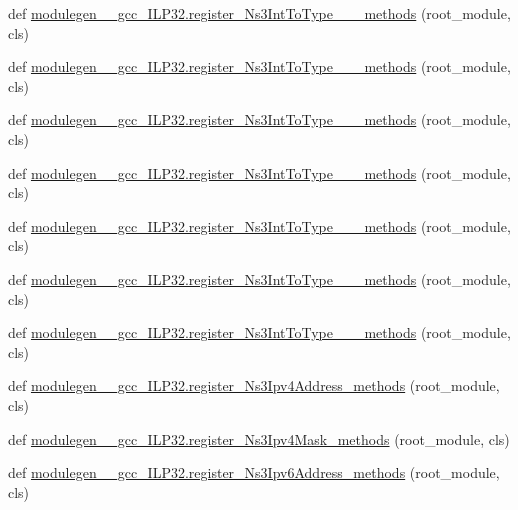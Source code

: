 \begin{DoxyCompactItemize}
\item 
def \hyperlink{namespacemodulegen____gcc__ILP32_a882cff629b302f667945a35a04773022}{modulegen\+\_\+\+\_\+gcc\+\_\+\+I\+L\+P32.\+register\+\_\+\+Ns3\+Int\+To\+Type\+\_\+\+\_\+\_\+methods} (root\+\_\+module, cls)
\item 
def \hyperlink{namespacemodulegen____gcc__ILP32_a4fd7cd80a67aebffa14f66c1b5bc99a0}{modulegen\+\_\+\+\_\+gcc\+\_\+\+I\+L\+P32.\+register\+\_\+\+Ns3\+Int\+To\+Type\+\_\+\+\_\+\_\+methods} (root\+\_\+module, cls)
\item 
def \hyperlink{namespacemodulegen____gcc__ILP32_a6f82a7285953e5b865f17eb8ae3ece8a}{modulegen\+\_\+\+\_\+gcc\+\_\+\+I\+L\+P32.\+register\+\_\+\+Ns3\+Int\+To\+Type\+\_\+\+\_\+\_\+methods} (root\+\_\+module, cls)
\item 
def \hyperlink{namespacemodulegen____gcc__ILP32_a0a126061e74df1f5650fc88031458e97}{modulegen\+\_\+\+\_\+gcc\+\_\+\+I\+L\+P32.\+register\+\_\+\+Ns3\+Int\+To\+Type\+\_\+\+\_\+\_\+methods} (root\+\_\+module, cls)
\item 
def \hyperlink{namespacemodulegen____gcc__ILP32_a9dd3ebb9eeeb3020ebe9c97563d6a654}{modulegen\+\_\+\+\_\+gcc\+\_\+\+I\+L\+P32.\+register\+\_\+\+Ns3\+Int\+To\+Type\+\_\+\+\_\+\_\+methods} (root\+\_\+module, cls)
\item 
def \hyperlink{namespacemodulegen____gcc__ILP32_a535b8e83f74940f4006189a7b73dc6d7}{modulegen\+\_\+\+\_\+gcc\+\_\+\+I\+L\+P32.\+register\+\_\+\+Ns3\+Int\+To\+Type\+\_\+\+\_\+\_\+methods} (root\+\_\+module, cls)
\item 
def \hyperlink{namespacemodulegen____gcc__ILP32_a3fc8ec1fcdc97a92ebb2a9eda99812a5}{modulegen\+\_\+\+\_\+gcc\+\_\+\+I\+L\+P32.\+register\+\_\+\+Ns3\+Int\+To\+Type\+\_\+\+\_\+\_\+methods} (root\+\_\+module, cls)
\item 
def \hyperlink{namespacemodulegen____gcc__ILP32_a3a069cad6e59687195ff869fd35923d3}{modulegen\+\_\+\+\_\+gcc\+\_\+\+I\+L\+P32.\+register\+\_\+\+Ns3\+Ipv4\+Address\+\_\+methods} (root\+\_\+module, cls)
\item 
def \hyperlink{namespacemodulegen____gcc__ILP32_a4f3623d807ca57aa642b7e9d784b1747}{modulegen\+\_\+\+\_\+gcc\+\_\+\+I\+L\+P32.\+register\+\_\+\+Ns3\+Ipv4\+Mask\+\_\+methods} (root\+\_\+module, cls)
\item 
def \hyperlink{namespacemodulegen____gcc__ILP32_acc57372433d228dd060a3165e8c17c71}{modulegen\+\_\+\+\_\+gcc\+\_\+\+I\+L\+P32.\+register\+\_\+\+Ns3\+Ipv6\+Address\+\_\+methods} (root\+\_\+module, cls)
\item 

\end{DoxyCompactItemize}
